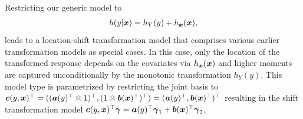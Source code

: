 \documentclass[12pt]{article}
\theoremstyle{plain}
\begin{document}
Restricting our generic model to
\begin{align}\label{eq:spec_trans}
h(y|\text{\boldmath$x$}) = h_Y(y) + h_{\text{\boldmath$x$}}(\text{\boldmath$x$}),
\end{align}
leads to a location-shift transformation model that comprises various earlier transformation models as special cases. In this case, only the location of the transformed response depends on the covariates via $h_{\text{\boldmath$x$}}(\text{\boldmath$x$})$ and higher moments are captured unconditionally by the monotonic transformation $h_Y(y)$. This model type is parametrized by restricting the joint basis to $\text{\boldmath$c$}(y,\text{\boldmath$x$})^\top = ((\text{\boldmath$a$}(y)^\top\otimes 1)^\top, (1 \otimes \text{\boldmath$b$}(\text{\boldmath$x$})^\top)^\top)=(\text{\boldmath$a$}(y)^\top, \text{\boldmath$b$}(\text{\boldmath$x$})^\top)^\top$ resulting in the shift transformation model  $\text{\boldmath$c$}(y,\text{\boldmath$x$})^\top \text{\boldmath$\gamma$} = \text{\boldmath$a$}(y)^\top \text{\boldmath$\gamma$}_1 + \text{\boldmath$b$}(\text{\boldmath$x$})^\top \text{\boldmath$\gamma$}_2$.
\end{document}
